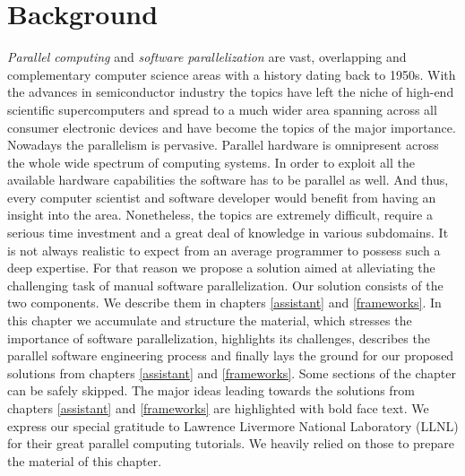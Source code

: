\chapter{Background}
\label{background}


\quad \textit{Parallel computing} and \textit{software parallelization} are vast, overlapping and complementary computer science areas with a history dating back to 1950s. With the advances in semiconductor industry the topics have left the niche of high-end scientific supercomputers and spread to a much wider area spanning across all consumer electronic devices and have become the topics of the major importance.\newline\null
\quad Nowadays the parallelism is pervasive. Parallel hardware is omnipresent across the whole wide spectrum of computing systems. In order to exploit all the available hardware capabilities the software has to be parallel as well. And thus, every computer scientist and software developer would benefit from having an insight into the area. Nonetheless, the topics are extremely difficult, require a serious time investment and a great deal of knowledge in various subdomains. It is not always realistic to expect from an average programmer to possess such a deep expertise. For that reason we propose a solution aimed at alleviating the challenging task of manual software parallelization. Our solution consists of the two components. We describe them in chapters \ref{assistant} and \ref{frameworks}.\newline\null
\quad In this chapter we accumulate and structure the material, which stresses the importance of software parallelization, highlights its challenges, describes the parallel software engineering process and finally lays the ground for our proposed solutions from chapters \ref{assistant} and \ref{frameworks}. Some sections of the chapter can be safely skipped. The major ideas leading towards the solutions from chapters \ref{assistant} and \ref{frameworks} are highlighted with bold face text. We express our special gratitude to Lawrence Livermore National Laboratory (LLNL) \cite{llnl_computing} for their great parallel computing tutorials. We heavily relied on those to prepare the material of this chapter.\newline\null
